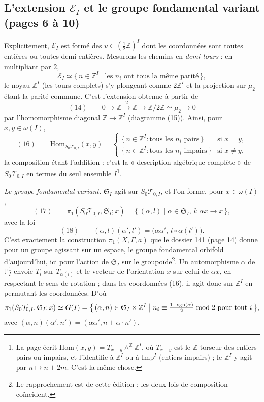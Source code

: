 \documentclass[11pt,a4paper]{article}
\begin{document}
\subsection*{L'extension $\mathcal{E}_I$ et le groupe fondamental variant
(pages 6 à 10)}

Explicitement, $\mathcal{E}_I$ est formé des $v \in (\frac12\mathbb{Z})^I$ dont
les coordonnées sont toutes entières ou toutes demi-entières. Mesurons les
chemins en \emph{demi-tours} : en multipliant par $2$,
\[
\mathcal{E}_I \simeq \{\, n \in \mathbb{Z}^I \mid \text{les } n_i \text{ ont
tous la même parité} \,\},
\]
le noyau $\mathbb{Z}^I$ (les tours complets) s'y plongeant comme $2\mathbb{Z}^I$
et la projection sur $\mu_2$ étant la parité commune. C'est l'extension
obtenue à partir de
\[
(14)\qquad 0 \to \mathbb{Z} \xrightarrow{\;2\;} \mathbb{Z} \to
\mathbb{Z}/2\mathbb{Z} \simeq \mu_2 \to 0
\]
par l'homomorphisme diagonal $\mathbb{Z} \to \mathbb{Z}^I$ (diagramme (15)).
Ainsi, pour $x, y \in \omega(I)$,
\[
(16)\qquad \mathrm{Hom}_{S_0\mathcal{T}_{0,I}}(x, y) =
\begin{cases}
\{\, n \in \mathbb{Z}^I : \text{tous les } n_i \text{ pairs} \,\} & \text{si } x = y,\\
\{\, n \in \mathbb{Z}^I : \text{tous les } n_i \text{ impairs} \,\} & \text{si } x \neq y,
\end{cases}
\]
la composition étant l'addition : c'est la « description algébrique
complète » de $S_0\mathcal{T}_{0,I}$ en termes du seul ensemble $I$\footnote{La
page écrit $\mathrm{Hom}(x,y) = T_{x-y} \wedge^{\mathbb{Z}} \mathbb{Z}^I$, où
$T_{x-y}$ est le $\mathbb{Z}$-torseur des entiers pairs ou impairs, et
l'identifie à $\mathbb{Z}^I$ ou à $\mathrm{Imp}^I$ (entiers impairs) ; le
$\mathbb{Z}^I$ y agit par $n \mapsto n + 2m$. C'est la même chose.}.

\emph{Le groupe fondamental variant.} $\mathfrak{S}_I$ agit sur
$S_0\mathcal{T}_{0,I}$, et l'on forme, pour $x \in \omega(I)$,
\[
(17)\qquad \pi_1(S_0\mathcal{T}_{0,I}, \mathfrak{S}_I; x) =
\{\, (\alpha, l) \mid \alpha \in \mathfrak{S}_I,\ l : \alpha x \to x \,\},
\]
avec la loi
\[
(18)\qquad (\alpha, l)(\alpha', l') = \bigl(\alpha\alpha',\ l \circ
\alpha(l')\bigr).
\]
C'est exactement la construction $\pi_1(X, \Gamma, a)$ que le dossier 141
(page 14) donne pour un groupe agissant sur un espace, le groupe fondamental
orbifold d'aujourd'hui, ici pour l'action de $\mathfrak{S}_I$ sur le
groupoïde\footnote{Le rapprochement est de cette édition ; les deux lois de
composition coïncident.}. Un automorphisme $\alpha$ de $\mathbb{P}^1_I$
envoie $T_i$ sur $T_{\alpha(i)}$ et le vecteur de l'orientation $x$ sur celui
de $\alpha x$, en respectant le sens de rotation ; dans les coordonnées (16),
il agit donc sur $\mathbb{Z}^I$ en permutant les coordonnées. D'où
\[
\pi_1(S_0\mathcal{T}_{0,I}, \mathfrak{S}_I; x) \simeq G(I) = \bigl\{\,
(\alpha, n) \in \mathfrak{S}_I \times \mathbb{Z}^I \bigm| n_i \equiv
\tfrac{1 - \mathrm{sgn}(\alpha)}{2} \bmod 2 \text{ pour tout } i \,\bigr\},
\]
avec $(\alpha, n)(\alpha', n') = (\alpha\alpha', n + \alpha\cdot n')$.
\end{document}
